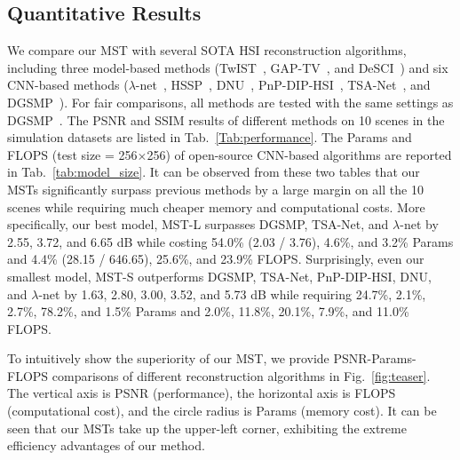\documentclass[10pt,twocolumn,letterpaper]{article}
\begin{document}
\subsection{Quantitative Results}
\vspace{-0.5mm}
We compare our MST with several SOTA HSI reconstruction algorithms, including three model-based methods (TwIST~\cite{twist}, GAP-TV~\cite{gap_tv}, and DeSCI~\cite{desci}) and six CNN-based methods ($\lambda$-net~\cite{lambda}, HSSP~\cite{hssp}, DNU~\cite{dnu}, PnP-DIP-HSI~\cite{self}, TSA-Net~\cite{tsa_net}, and DGSMP~\cite{gsm}). For fair comparisons, all methods are tested with the same settings as DGSMP~\cite{gsm}. The PSNR and SSIM results of different methods  on 10 scenes in the simulation datasets are listed in Tab.~\ref{Tab:performance}. The Params and FLOPS (test size = 256$\times$256) of open-source CNN-based algorithms are reported in Tab.~\ref{tab:model_size}. It can be observed from these two tables that our MSTs significantly surpass previous methods by a large margin on all the 10 scenes while requiring much cheaper memory and computational costs. More specifically, our best model, MST-L surpasses DGSMP, TSA-Net, and $\lambda$-net by 2.55, 3.72, and 6.65 dB while costing 54.0\% (2.03 / 3.76), 4.6\%, and 3.2\% Params and 4.4\% (28.15 / 646.65), 25.6\%, and 23.9\% FLOPS. Surprisingly, even our smallest model, MST-S outperforms DGSMP, TSA-Net, PnP-DIP-HSI, DNU, and $\lambda$-net by 1.63, 2.80, 3.00, 3.52, and 5.73 dB while requiring 24.7\%, 2.1\%, 2.7\%, 78.2\%, and 1.5\% Params and 2.0\%, 11.8\%, 20.1\%, 7.9\%, and 11.0\% FLOPS. 

To intuitively show the superiority of our MST, we provide PSNR-Params-FLOPS comparisons of different reconstruction algorithms in Fig.~\ref{fig:teaser}. The vertical axis is PSNR (performance), the horizontal axis is FLOPS (computational cost), and the circle radius is Params (memory cost). It can be seen that our MSTs take up the upper-left corner, exhibiting the extreme efficiency advantages of our method.



\vspace{-1.8mm}
\end{document}
